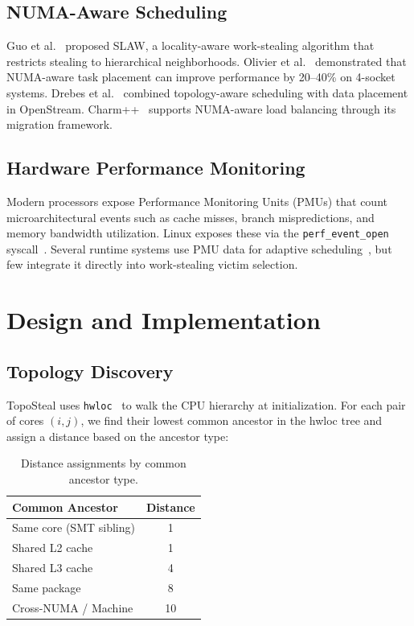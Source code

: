 \documentclass[conference]{IEEEtran}
\begin{document}
\subsection{NUMA-Aware Scheduling}

Guo et al.~\cite{guo2010} proposed SLAW, a locality-aware work-stealing algorithm that restricts stealing to hierarchical neighborhoods. Olivier et al.~\cite{olivier2012} demonstrated that NUMA-aware task placement can improve performance by 20--40\% on 4-socket systems. Drebes et al.~\cite{drebes2014} combined topology-aware scheduling with data placement in OpenStream. Charm++~\cite{charm} supports NUMA-aware load balancing through its migration framework.

\subsection{Hardware Performance Monitoring}

Modern processors expose Performance Monitoring Units (PMUs) that count microarchitectural events such as cache misses, branch mispredictions, and memory bandwidth utilization. Linux exposes these via the \texttt{perf\_event\_open} syscall~\cite{perfevents}. Several runtime systems use PMU data for adaptive scheduling~\cite{autoperfmon}, but few integrate it directly into work-stealing victim selection.

\section{Design and Implementation}

\subsection{Topology Discovery}

TopoSteal uses \texttt{hwloc}~\cite{hwloc} to walk the CPU hierarchy at initialization. For each pair of cores $(i, j)$, we find their lowest common ancestor in the hwloc tree and assign a distance based on the ancestor type:

\begin{table}[h]
\centering
\caption{Distance assignments by common ancestor type.}
\begin{tabular}{lc}
\toprule
\textbf{Common Ancestor} & \textbf{Distance} \\
\midrule
Same core (SMT sibling) & 1 \\
Shared L2 cache & 1 \\
Shared L3 cache & 4 \\
Same package & 8 \\
Cross-NUMA / Machine & 10 \\
\bottomrule
\end{tabular}
\label{tab:distances}
\end{table}
\end{document}
